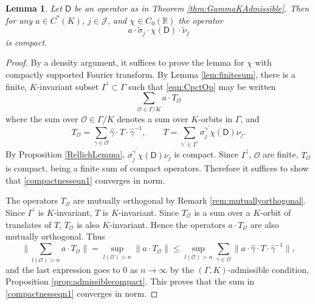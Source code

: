 \documentclass[11pt,reqno]{amsart}
\newtheorem{lemma}[theorem]{Lemma}
\theoremstyle{definition}
\theoremstyle{remark}
\newcommand{\ti}[1]{\widetilde{#1}}
\newcommand{\wh}[1]{\widehat{#1}}
\newcommand{\st}[1]{\mathsf{#1}}
\def\O{\ensuremath{\mathcal{O}}}
\def\J{\ensuremath{\mathcal{J}}}
\def\O{\ensuremath{\mathcal{O}}}
\def\bR{\ensuremath{\mathbb{R}}}
\def\.{\ensuremath{\cdot}}
\def\hgamma{\ensuremath{\widehat{\gamma}}}
\begin{document}
\begin{lemma}
\label{prop:compactness}
Let $\st{D}$ be an operator as in Theorem \ref{thm:GammaKAdmissible}.  Then for any $a \in C^\ast(K)$, $j \in \J$, and $\chi \in C_0(\bR)$ the operator
\begin{equation} 
\label{eqn:CpctOp}
a\. \ti{\sigma}_j \.\chi(\st{D})\.\ti{\nu}_j 
\end{equation}
is compact.
\end{lemma}
\begin{proof}
By a density argument, it suffices to prove the lemma for $\chi$ with compactly supported Fourier transform.  By Lemma \ref{lem:finitesum}, there is a finite, $K$-invariant subset $\Gamma^\prime \subset \Gamma$ such that \eqref{eqn:CpctOp} may be written
\begin{equation} 
\label{compactnesseqn1}
\sum_{\O \in \Gamma/K} a\. T_{\O}
\end{equation}
where the sum over $\O \in \Gamma/K$ denotes a sum over $K$-orbits in $\Gamma$, and
\[ T_{\O}=\sum_{\gamma \in \O} \hgamma\.T\.\hgamma^{-1}, \qquad T=\sum_{\gamma^\prime \in \Gamma^\prime} \sigma_j^{\gamma^\prime}\chi(\st{D})\nu_j.\]
By Proposition \ref{RellichLemma}, $\sigma_j^{\gamma^\prime}\chi(\st{D})\nu_j$ is compact.  Since $\Gamma^\prime$, $\O$ are finite, $T_{\O}$ is compact, being a finite sum of compact operators.  Therefore it suffices to show that \eqref{compactnesseqn1} converges in norm.

The operators $T_{\O}$ are mutually orthogonal by Remark \ref{rem:mutuallyorthogonal}.  Since $\Gamma^\prime$ is $K$-invariant, $T$ is $K$-invariant.  Since $T_{\O}$ is a sum over a $K$-orbit of translates of $T$, $T_{\O}$ is also $K$-invariant.  Hence the operators $a\.T_{\O}$ are also mutually orthogonal.  Thus
\[ \Bigg\|\sum_{l(\O)>n}a \. T_\O\Bigg\|=\sup_{l(\O)>n}\|a\.T_\O\|\le \sup_{l(\O)>n}\sum_{\gamma \in \O}\|a\.\wh{\gamma}\.T\.\wh{\gamma}^{-1}\|,\]
and the last expression goes to $0$ as $n \rightarrow \infty$ by the $(\Gamma,K)$-admissible condition, Proposition \ref{prop:admissiblecompact}. This proves that the sum in \eqref{compactnesseqn1} converges in norm.
\end{proof}
 
\end{document}
